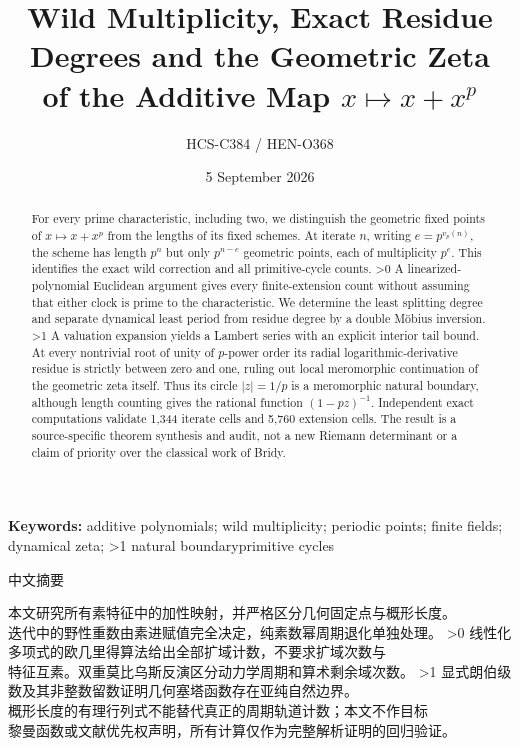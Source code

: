 \documentclass[10pt]{article}
\title{Wild Multiplicity, Exact Residue Degrees and the Geometric Zeta\protect\\
of the Additive Map $x\mapsto x+x^p$}
\author{HCS-C384 / HEN-O368}
\date{5 September 2026}
\begin{document}
\maketitle
\begin{abstract}
For every prime characteristic, including two, we distinguish the geometric
fixed points of $x\mapsto x+x^p$ from the lengths of its fixed schemes.
At iterate $n$, writing $e=p^{v_p(n)}$, the scheme has length $p^n$ but only
$p^{n-e}$ geometric points, each of multiplicity $p^e$.
This identifies the exact wild correction and all primitive-cycle counts.
\ifnum\CRevisionRound>0
A linearized-polynomial Euclidean argument gives every finite-extension
count without assuming that either clock is prime to the characteristic.
We determine the least splitting degree and separate dynamical least period
from residue degree by a double M\"obius inversion.
\fi
\ifnum\CRevisionRound>1
A valuation expansion yields a Lambert series with an explicit interior
tail bound. At every nontrivial root of unity of $p$-power order its radial
logarithmic-derivative residue is strictly between zero and one, ruling
out local meromorphic continuation of the geometric zeta itself. Thus its
circle $|z|=1/p$ is a meromorphic natural boundary, although length counting
gives the rational function $(1-pz)^{-1}$. Independent exact computations
validate 1,344 iterate cells and 5,760 extension cells. The result is a
source-specific theorem synthesis and audit, not a new Riemann determinant
or a claim of priority over the classical work of Bridy.
\fi
\end{abstract}
\noindent\textbf{Keywords:} additive polynomials; wild multiplicity; periodic points;
finite fields; dynamical zeta; \ifnum\CRevisionRound>1 natural boundary\else primitive cycles\fi

\begin{center}{\zhfont\large 中文摘要}\end{center}
{\zhfont\begin{flushleft}
本文研究所有素特征中的加性映射，并严格区分几何固定点与概形长度。\\
迭代中的野性重数由素进赋值完全决定，纯素数幂周期退化单独处理。
\ifnum\CRevisionRound>0
线性化多项式的欧几里得算法给出全部扩域计数，不要求扩域次数与\\
特征互素。双重莫比乌斯反演区分动力学周期和算术剩余域次数。
\fi
\ifnum\CRevisionRound>1
显式朗伯级数及其非整数留数证明几何塞塔函数存在亚纯自然边界。\\
概形长度的有理行列式不能替代真正的周期轨道计数；本文不作目标\\
黎曼函数或文献优先权声明，所有计算仅作为完整解析证明的回归验证。
\fi
\end{flushleft}}
\end{document}
